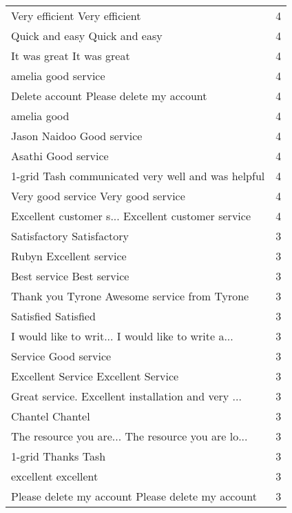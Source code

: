 \begin{tabular}{lr}
Very efficient Very efficient                      &        4 \\
Quick and easy Quick and easy                      &        4 \\
It was great It was great                          &        4 \\
amelia good service                                &        4 \\
Delete account Please delete my account            &        4 \\
amelia good                                        &        4 \\
Jason Naidoo Good service                          &        4 \\
Asathi Good service                                &        4 \\
1-grid Tash communicated very well and was helpful &        4 \\
Very good service Very good service                &        4 \\
Excellent customer s... Excellent customer service &        4 \\
Satisfactory Satisfactory                          &        3 \\
Rubyn Excellent service                            &        3 \\
Best service Best service                          &        3 \\
Thank you Tyrone Awesome service from Tyrone       &        3 \\
Satisfied Satisfied                                &        3 \\
I would like to writ... I would like to write a... &        3 \\
Service Good service                               &        3 \\
Excellent Service Excellent Service                &        3 \\
Great service. Excellent installation and very ... &        3 \\
Chantel Chantel                                    &        3 \\
The resource you are... The resource you are lo... &        3 \\
1-grid Thanks Tash                                 &        3 \\
excellent excellent                                &        3 \\
Please delete my account Please delete my account  &        3 \\

\end{tabular}
